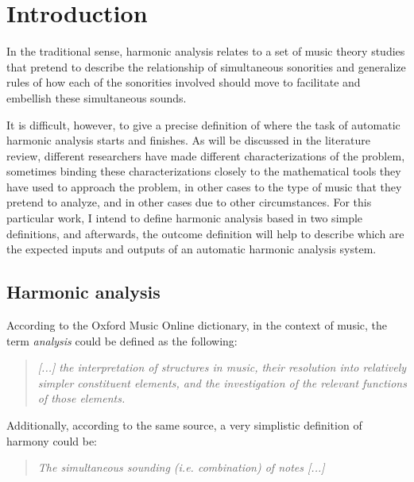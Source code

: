 \chapter{Introduction}
\label{chap:introduction}
In the traditional sense, harmonic analysis relates to a set of music theory studies that pretend to describe the relationship of simultaneous sonorities and generalize rules of how each of the sonorities involved should move to facilitate and embellish these simultaneous sounds.

It is difficult, however, to give a precise definition of where the task of automatic harmonic analysis starts and finishes. As will be discussed in the literature review, different researchers have made different characterizations of the problem, sometimes binding these characterizations closely to the mathematical tools they have used to approach the problem, in other cases to the type of music that they pretend to analyze, and in other cases due to other circumstances. For this particular work, I intend to define harmonic analysis based in two simple definitions, and afterwards, the outcome definition will help to describe which are the expected inputs and outputs of an automatic harmonic analysis system.

\section{Harmonic analysis}
According to the Oxford Music Online dictionary, in the context of music, the term \emph{analysis} could be defined as the following: \cite{oxfordanalysis}

\begin{quote}
\centering
\emph{[...] the interpretation of structures in music, \linebreak
their resolution into relatively simpler constituent elements, \linebreak and the investigation of the relevant functions of those elements.}
\end{quote}

Additionally, according to the same source, a very simplistic definition of harmony could be: \cite{oxfordharmony}

\begin{quote}
\centering
\emph{The simultaneous sounding (i.e. combination) of notes [...]}
\end{quote}


